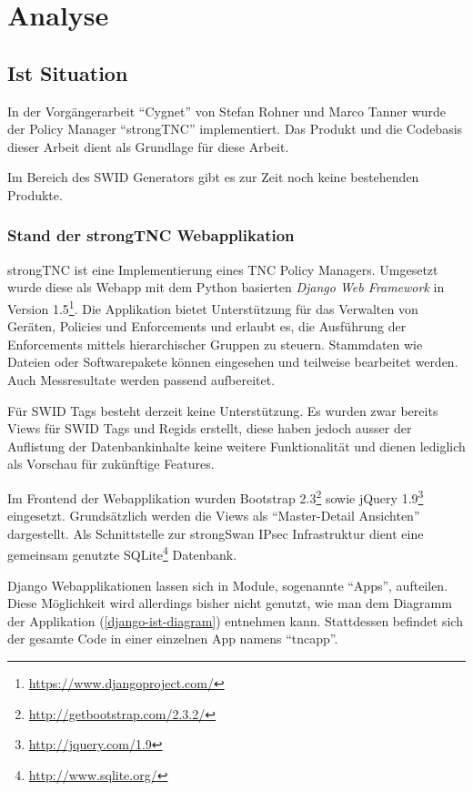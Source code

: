 \chapter{Analyse}

\section{Ist Situation}

In der Vorgängerarbeit \enquote{Cygnet} von Stefan Rohner und Marco
Tanner\cite{cygnet:2013} wurde der Policy Manager \enquote{strongTNC}
implementiert. Das Produkt und die Codebasis dieser Arbeit dient als Grundlage
für diese Arbeit.

Im Bereich des SWID Generators gibt es zur Zeit noch keine bestehenden Produkte.

\subsection{Stand der strongTNC Webapplikation} 
\label{analyse:stand}

strongTNC ist eine Implementierung eines TNC Policy Managers. Umgesetzt wurde
diese als Webapp mit dem Python basierten \textit{Django Web Framework} in
Version 1.5\footnote{\url{https://www.djangoproject.com/}}. Die Applikation
bietet Unterstützung für das Verwalten von Geräten, Policies und Enforcements
und erlaubt es, die Ausführung der Enforcements mittels hierarchischer Gruppen
zu steuern. Stammdaten wie Dateien oder Softwarepakete können eingesehen und
teilweise bearbeitet werden. Auch Messresultate werden passend aufbereitet.

Für SWID Tags besteht derzeit keine Unterstützung. Es wurden zwar bereits Views
für SWID Tags und Regids erstellt, diese haben jedoch ausser der Auflistung der
Datenbankinhalte keine weitere Funktionalität und dienen lediglich als Vorschau
für zukünftige Features.

Im Frontend der Webapplikation wurden Bootstrap
2.3\footnote{\url{http://getbootstrap.com/2.3.2/}} sowie jQuery
1.9\footnote{\url{http://jquery.com/1.9}} eingesetzt. Grundsätzlich werden die
Views als \enquote{Master-Detail Ansichten} dargestellt. Als Schnittstelle zur
strongSwan IPsec Infrastruktur dient eine gemeinsam genutzte
SQLite\footnote{\url{http://www.sqlite.org/}} Datenbank.

Django Webapplikationen lassen sich in Module, sogenannte \enquote{Apps},
aufteilen. Diese Möglichkeit wird allerdings bisher nicht genutzt, wie man dem
Diagramm der Applikation (\autoref{django-ist-diagram}) entnehmen kann.
Stattdessen befindet sich der gesamte Code in einer einzelnen App namens
\enquote{tncapp}.


